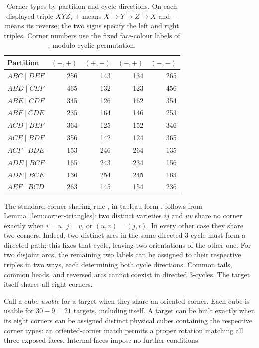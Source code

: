 \documentclass[11pt]{article}
\begin{document}
\begin{table}[ht]
\centering
\begin{tabular}{lrrrr}\toprule
Partition & $(+,+)$ & $(+,-)$ & $(-,+)$ & $(-,-)$ \\\midrule
$ABC\mid DEF$ & 256 & 143 & 134 & 265 \\
$ABD\mid CEF$ & 465 & 132 & 123 & 456 \\
$ABE\mid CDF$ & 345 & 126 & 162 & 354 \\
$ABF\mid CDE$ & 235 & 164 & 146 & 253 \\
$ACD\mid BEF$ & 364 & 125 & 152 & 346 \\
$ACE\mid BDF$ & 356 & 142 & 124 & 365 \\
$ACF\mid BDE$ & 153 & 246 & 264 & 135 \\
$ADE\mid BCF$ & 165 & 243 & 234 & 156 \\
$ADF\mid BCE$ & 136 & 254 & 245 & 163 \\
$AEF\mid BCD$ & 263 & 145 & 154 & 236 \\
\bottomrule\end{tabular}
\caption{Corner types by partition and cycle directions. On each displayed
triple $XYZ$, $+$ means $X\to Y\to Z\to X$ and $-$ means its reverse;
the two signs specify the left and right triples. Corner numbers use the
fixed face-colour labels of \cite{JR}, modulo cyclic permutation.}
\label{tab:corners}
\end{table}

The standard corner-sharing rule \cite[Lemma~2.7]{B2008}, in tableau form
\cite[Propositions~1--2 and Properties~1--2]{H}, follows from
Lemma~\ref{lem:corner-triangles}: two distinct varieties $ij$ and $uv$ share
no corner exactly when
$i=u$, $j=v$, or $(u,v)=(j,i)$. In every other case they share two corners.
Indeed, two distinct arcs in the same directed 3-cycle must form a directed
path; this fixes that cycle, leaving two orientations of the other one.
For two disjoint arcs, the remaining two labels can be assigned to their
respective triples in two ways, each determining both cycle directions.
Common tails, common heads, and reversed arcs cannot coexist in directed
3-cycles. The target itself shares all eight corners.

Call a cube \emph{usable} for a target when they share an oriented corner.
Each cube is usable for $30-9=21$ targets, including itself. A target can
be built exactly when its eight corners can be assigned distinct physical
cubes containing the respective corner types: an oriented-corner match
permits a proper rotation matching all three exposed faces. Internal faces
impose no further conditions.
\end{document}
